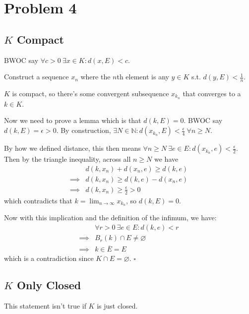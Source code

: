\documentclass[12pt]{article}
\newcommand{\N}{\mathbb{N}}
\begin{document}
\pagebreak

\section{Problem 4}

\subsection{\texorpdfstring{$K$}{K} Compact}

BWOC say $\forall c > 0\ \exists x \in K: d(x, E) < c$.

Construct a sequence $x_n$ where the $n$th element is any $y \in K$ s.t. $d(y, E) < \frac{1}{n}$.

$K$ is compact, so there's some convergent subsequence $x_{k_n}$ that converges to a $k \in K$.

Now we need to prove a lemma which is that $d(k, E)=0$.
BWOC say $d(k, E)=\epsilon > 0$.
By construction, $\exists N \in \N: d(x_{k_n}, E) < \frac{\epsilon}{4}\ \forall n \ge N$.

By how we defined distance, this then means $\forall n \ge N\ \exists e \in E: d(x_{k_n}, e) < \frac{\epsilon}{2}$.
Then by the triangle inequality, across all $n \ge N$ we have
\begin{align*}
             & d(k, x_n) + d(x_n, e) \ge d(k, e)    \\
  \implies{} & d(k, x_n) \ge d(k, e) - d(x_n, e)    \\
  \implies{} & d(k, x_n) \ge \frac{\epsilon}{2} > 0
\end{align*}
which contradicts that $k=\lim_{n \to \infty} x_{k_n}$, so $d(k, E)=0$.

Now with this implication and the definition of the infimum, we have:
\begin{align*}
             & \forall r > 0\ \exists e \in E: d(k, e) < r \\
  \implies{} & B_r(k) \cap E \ne \varnothing               \\
  \implies{} & k \in \overline{E}=E
\end{align*}
which is a contradiction since $K \cap E = \varnothing$. $\square$

\subsection{\texorpdfstring{$K$}{K} Only Closed}

This statement isn't true if $K$ is just closed.
\end{document}
